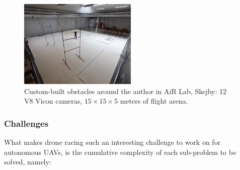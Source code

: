 \begin{figure}[h]
	\centering
	\includegraphics[width=0.5\textwidth]{figure/tiny_me.jpg}
	\caption{Custom-built obstacles around the author in AiR Lab, Skejby: 12 V8
	Vicon cameras, $15 \times 15 \times 5$ meters of flight arena.}
	\label{fig:mygates}
\end{figure}

\subsubsection{Challenges}

What makes drone racing such an interesting challenge to work on for autonomous
UAVs, is the cumulative complexity of each sub-problem to be solved, namely:

